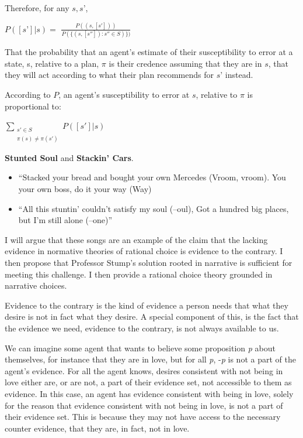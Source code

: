 \documentclass[
  letterpaper,
  DIV=11,
  numbers=noendperiod]{scrartcl}
\providecommand{\tightlist}{%
  \setlength{\itemsep}{0pt}\setlength{\parskip}{0pt}}
\begin{document}
Therefore, for any \(s,s’\),

\(P([s’]|s) =\) \(\frac{P((s,[s']))}{P(\{(s,[s'']):s''\in S)\})}\)

That the probability that an agent's estimate of their susceptibility to
error at a state, s, relative to a plan, \(\pi\) is their credence
assuming that they are in \(s\), that they will act according to what
their plan recommends for \(s’\) instead.

According to \(P\), an agent's susceptibility to error at \(s\),
relative to \(\pi\) is proportional to:

\(\sum\limits_{\substack{s' \in S \\ \pi(s)\neq\pi(s')}}P([s']|s)\)

\textbf{Stunted Soul} and \textbf{Stackin' Cars}.

\begin{itemize}
\tightlist
\item
  ``Stacked your bread and bought your own Mercedes (Vroom, vroom). You
  your own boss, do it your way (Way)
\item
  ``All this stuntin' couldn't satisfy my soul (--oul), Got a hundred
  big places, but I'm still alone (--one)''
\end{itemize}

I will argue that these songs are an example of the claim that the
lacking evidence in normative theories of rational choice is evidence to
the contrary. I then propose that Professor Stump's solution rooted in
narrative is sufficient for meeting this challenge. I then provide a
rational choice theory grounded in narrative choices.

Evidence to the contrary is the kind of evidence a person needs that
what they desire is not in fact what they desire. A special component of
this, is the fact that the evidence we need, evidence to the contrary,
is not always available to us.

We can imagine some agent that wants to believe some proposition
\emph{p} about themselves, for instance that they are in love, but for
all \emph{p}, -\emph{p} is not a part of the agent's evidence. For all
the agent knows, desires consistent with not being in love either are,
or are not, a part of their evidence set, not accessible to them as
evidence. In this case, an agent has evidence consistent with being in
love, solely for the reason that evidence consistent with not being in
love, is not a part of their evidence set. This is because they may not
have access to the necessary counter evidence, that they are, in fact,
not in love.
\end{document}
